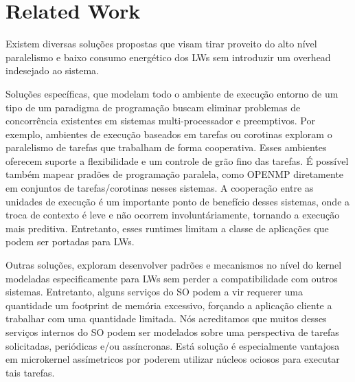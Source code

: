 \section{Related Work}
\label{sec:related-work}

	Existem diversas soluções propostas que visam tirar proveito do alto nível
	paralelismo e baixo consumo energético dos LWs sem introduzir um overhead
	indesejado ao sistema.

	Soluções específicas, que modelam todo o ambiente de execução entorno de um
	tipo de um paradigma de programação buscam eliminar problemas de concorrência
	existentes em sistemas multi-processador e preemptivos.
	Por exemplo, ambientes de execução baseados em tarefas ou corotinas exploram
	o paralelismo de tarefas que trabalham de forma cooperativa.
	Esses ambientes oferecem suporte a flexibilidade e um controle de grão fino
	das tarefas. É possível também mapear pradões de programação paralela, como
	OPENMP diretamente em conjuntos de tarefas/corotinas nesses sistemas.
	A cooperação entre as unidades de execução é um importante ponto de
	benefício desses sistemas, onde a troca de contexto é leve e não ocorrem
	involuntáriamente, tornando a execução mais preditiva.
	Entretanto, esses runtimes limitam a classe de aplicações que podem ser
	portadas para LWs. 

	Outras soluções, exploram desenvolver padrões e mecanismos no nível do
	kernel modeladas especificamente para LWs sem perder a compatibilidade com
	outros sistemas. Entretanto, alguns serviços do SO podem a vir requerer uma
	quantidade um footprint de memória excessivo, forçando a aplicação cliente
	a trabalhar com uma quantidade limitada.
	Nós acreditamos que muitos desses serviços internos do SO podem ser
	modelados sobre uma perspectiva de tarefas solicitadas, periódicas e/ou
	assíncronas. Está solução é especialmente vantajosa em microkernel assímetricos
	por poderem utilizar núcleos ociosos para executar tais tarefas.
